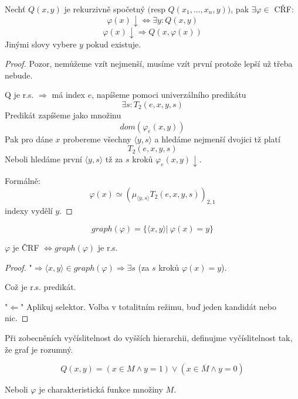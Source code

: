 \begin{theorem}[O selektoru]\label{selector}
	Nechť $Q(x, y)$ je rekurzivně spočetný $($resp $Q(x_1, \ldots, x_n, y))$, pak $\exists \varphi \in$ CŘF:
	\[ \varphi(x) \downarrow \iff \exists y: Q(x, y) \]
		\[ \varphi(x) \downarrow \Rightarrow Q(x, \varphi(x)) \]
	Jinými slovy vybere $y$ pokud existuje.
\end{theorem}
\begin{proof}
	Pozor, nemůžeme vzít nejmenší, musíme vzít první protože lepší už třeba nebude.

	Q je r.s. $\Rightarrow$ má index $e$, napíšeme pomoci univerzálního predikátu
	\[ \exists s: T_2(e, x, y, s) \]
	Predikát zapíšeme jako množinu
	\[ dom(\varphi_e(x, y)) \]
	Pak pro dáne $x$ probereme všechny $\langle y, s \rangle$ a hledáme nejmenší dvojici tž platí
	\[ T_2(e, x, y, s) \]
	Neboli hledáme první $\langle y, s \rangle$ tž za $s$ kroků $\varphi_e(x,y) \downarrow$.

	Formálně:
	\[ \varphi(x) \simeq (\mu_{\langle y, s \rangle} T_2(e, x, y, s))_{2,1} \]
	indexy vydělí $y$.
\end{proof}

\begin{definition}
	\[ graph(\varphi) = \{ \langle x, y \rangle |\ \varphi(x) = y \} \]
\end{definition}
\begin{consequence}
	$\varphi$ je ČRF $\iff graph(\varphi)$ je r.s.
\end{consequence}
\begin{proof}
	"$\Rightarrow \langle x, y \rangle \in graph(\varphi) \Rightarrow \exists s$ (za $s$ kroků $\varphi(x) = y$).

	Což je r.s. predikát.

	"$\Leftarrow$" Aplikuj selektor. Volba v totalitním režimu, buď jeden kandidát nebo nic.
\end{proof}

\begin{note}
	Při zobecněních vyčíslitelnost do vyšších hierarchii, definujme vyčíslitelnost tak, že graf je rozumný.
\end{note}

\begin{theorem}
	\[ Q(x,y) = (x \in M \land y = 1) \lor (x \in \overline{M} \land y = 0) \]

	Neboli $\varphi$ je charakteristická funkce množiny $M$.
\end{theorem}

